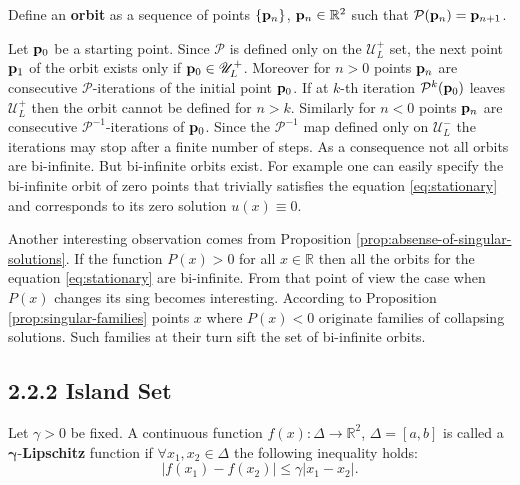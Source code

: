 \begin{definition}
	Define an {\bf orbit} as a sequence of points $\{ \vb{p}_n \}$, $\vb{p}_n \in \mathbb{R}^2$ such that $\mathcal{P}(\vb{p}_n) = \vb{p}_{n+1}$.
\label{def:orbit}
\end{definition}

Let $\vb{p}_0$ be a starting point.
Since $\mathcal{P}$ is defined only on the $\mathscr{U}_L^+$ set, the next point $\vb{p}_1$ of the orbit exists only if $\vb{p}_0 \in \mathscr{U}_L^+$.
Moreover for $n > 0$ points $\vb{p}_n$ are consecutive $\mathcal{P}$-iterations of the initial point $\vb{p}_0$.
If at $k$-th iteration $\mathcal{P}^k(\vb{p}_0)$ leaves $\mathscr{U}_L^+$ then the orbit cannot be defined for $n > k$.
Similarly for $n < 0$ points $\vb{p}_n$ are consecutive $\mathcal{P}^{-1}$-iterations of $\vb{p}_0$.
Since the $\mathcal{P}^{-1}$ map defined only on $\mathscr{U}_L^-$ the iterations may stop after a finite number of steps.
As a consequence not all orbits are bi-infinite.
But bi-infinite orbits exist.
For example one can easily specify the bi-infinite orbit of zero points that trivially satisfies the equation \eqref{eq:stationary} and corresponds to its zero solution $u(x) \equiv 0$.

Another interesting observation comes from Proposition \ref{prop:absense-of-singular-solutions}.
If the function $P(x) > 0$ for all $x \in \mathbb{R}$ then all the orbits for the equation \eqref{eq:stationary} are bi-infinite.
From that point of view the case when $P(x)$ changes its sing becomes interesting.
According to Proposition \ref{prop:singular-families} points $x$ where $P(x) < 0$ originate families of collapsing solutions.
Such families at their turn sift the set of bi-infinite orbits.

\subsection*{2.2.2 Island Set}

\begin{definition}
	Let $\gamma > 0$ be fixed.
	A continuous function $f(x): \Delta \to \mathbb{R}^2$, $\Delta = [a, b]$ is called a $\bm{\gamma}$-{\bf Lipschitz} function if $\forall x_1, x_2 \in \Delta$ the following inequality holds:
	\begin{equation}
		|f(x_1) - f(x_2)| \le \gamma |x_1 - x_2|.
	\end{equation}
\end{definition}

